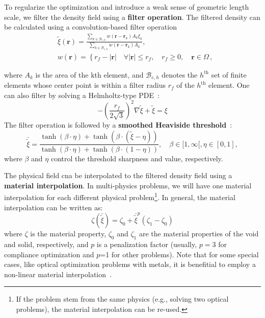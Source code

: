 To regularize the optimization and introduce a weak sense of geometric length scale, we filter
the density field using a \textbf{filter operation}. The filtered density can be calculated using a 
convolution-based filter operation~\cite{projection}
\begin{equation}
    \begin{aligned}
    & \tilde{\xi}(\mathbf{r})=\frac{\sum_{k \in \mathcal{B}_{e, h}} w\left(\mathbf{r}-\mathbf{r}_k\right) A_k \xi_k}{\sum_{k \in \mathcal{B}_{e, h}} w\left(\mathbf{r}-\mathbf{r}_k\right) A_k}, \\
    & w(\mathbf{r})=\left\{r_f-|\mathbf{r}| \quad \forall|\mathbf{r}| \leq r_f, \quad r_f \geq 0, \quad \mathbf{r} \in \Omega\right.\,,
    \end{aligned}
\end{equation}

where $A_k$ is the area of the kth element, and $\mathcal{B}_{e, h}$ denotes the
$h^\text{th}$ set of finite elements whose center point is within a filter radius $r_f$ of the
$h^\text{th}$ element. One can also filter by solving a Helmholtz-type PDE~\cite{PDE_filter}:
\begin{equation}
    -\left(\frac{r_f}{2 \sqrt{3}}\right)^2 \nabla \tilde{\xi}+\tilde{\xi}=\xi
\end{equation}
The filter operation is followed by a \textbf{smoothed Heaviside threshold}~\cite{projection}:
\begin{equation}
    \bar{\tilde{\xi}}=\frac{\tanh (\beta \cdot \eta)+\tanh (\beta \cdot(\tilde{\xi}-\eta))}{\tanh (\beta \cdot \eta)+\tanh (\beta \cdot(1-\eta))}, \quad \beta \in[1, \infty[, \eta \in[0,1],
\end{equation}
where $\beta$ and $\eta$ control the threshold sharpness and value, respectively.

The physical field cna be interpolated to the filtered density field using a \textbf{material interpolation}.
In multi-physics problems, we will have one material interpolation for each different physical problem\footnote{If the problem stem from the same physics (e.g., solving two optical problems), the material interpolation can be re-used.}.
In general, the material interpolation can be written as:
\begin{equation}
    \zeta(\bar{\tilde{\xi}})=\zeta_0+\bar{\tilde{\xi}}^p\left(\zeta_1-\zeta_0\right)
\end{equation}
where $\zeta$ is the material property, $\zeta_0$ and $\zeta_1$ are the material properties of the void and solid, respectively, and $p$
is a penalization factor (usually, $p=3$ for compliance optimization and $p$=1 for other problems). Note that for some
special cases, like optical optimization problems with metals, it is benefitial to employ a non-linear material interpolation~\cite{nonlinear_interp}.

